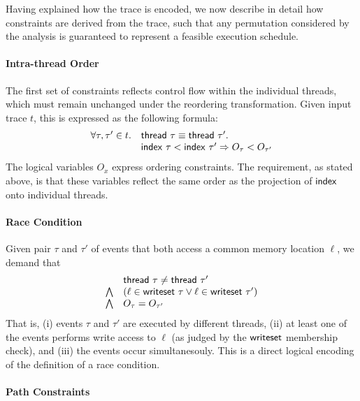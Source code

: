 Having explained how the trace is encoded, we now describe in detail how constraints are derived from the trace, such that any permutation considered by the analysis is guaranteed to represent a feasible execution schedule.

\paragraph{Intra-thread Order}

The first set of constraints reflects control flow within the individual threads, which must remain unchanged under the reordering transformation. Given input trace $t$, this is expressed as the following formula:
$$
\begin{array}{rl}
\forall \tau,\tau' \in t. & {\sf thread}\ \tau \equiv {\sf thread}\ \tau'. \\
& {\sf index}\ \tau < {\sf index}\ \tau' \Rightarrow O_{\tau} < O_{\tau'}
\end{array}
$$ 
The logical variables $O_x$ express ordering constraints. The requirement, as stated above, is that these variables
reflect the same order as the projection of ${\sf index}$ onto individual threads.

\paragraph{Race Condition}

Given pair $\tau$ and $\tau'$ of events that both access a common memory location $\ell$, we demand that
$$
\begin{array}{rl}
& {\sf thread}\ \tau \neq {\sf thread}\ \tau' \\
\bigwedge 	& (\ell \in {\sf writeset}\ \tau \vee \ell \in {\sf writeset}\ \tau') \\
\bigwedge   & O_{\tau} = O_{\tau'}
\end{array}
$$
That is, (i) events $\tau$ and $\tau'$ are executed by different threads, (ii) at least one of the events performs write access to $\ell$ (as judged by the ${\sf writeset}$ membership check), and (iii) the events occur simultanesouly. This is a direct logical encoding of the definition of a race condition.

\paragraph{Path Constraints}

